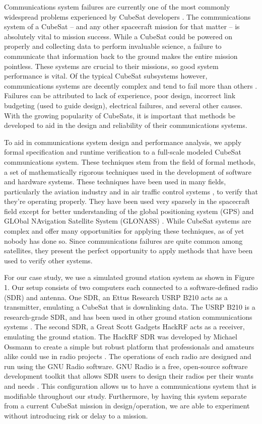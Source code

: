 \documentclass[conf]{new-aiaa}
\begin{document}
Communications system failures are currently one of the most commonly widespread problems experienced by CubeSat developers \cite{Improving2017,Langer2016}. The communications system of a CubeSat -- and any other spacecraft mission for that matter -- is absolutely vital to mission success. While a CubeSat could be powered on properly and collecting data to perform invaluable science, a failure to communicate that information back to the ground makes the entire mission pointless. These systems are crucial to their missions, so good system performance is vital. Of the typical CubeSat subsystems however, communications systems are decently complex and tend to fail more than others \cite{Improving2017,cubesat101}. Failures can be attributed to lack of experience, poor design, incorrect link budgeting (used to guide design), electrical failures, and several other causes. With the growing popularity of CubeSats, it is important that methods be developed to aid in the design and reliability of their communications systems.

To aid in communications system design and performance analysis, we apply formal specification and runtime verification to a full-scale modeled CubeSat communications system. These techniques stem from the field of formal methods, a set of mathematically rigorous techniques used in the development of software and hardware systems. These techniques have been used in many fields, particularly the aviation industry and in air traffic control systems \cite{GCMTR16,DRR17}, to verify that they're operating properly. They have been used very sparsely in the spacecraft field except for better understanding of the global positioning system (GPS) and GLObal NAvigation Satellite System (GLONASS) \cite{peng2013}. While CubeSat systems are complex and offer many opportunities for applying these techniques, as of yet nobody has done so. Since communications failures are quite common among satellites, they present the perfect opportunity to apply methods that have been used to verify other systems.

For our case study, we use a simulated ground station system as shown in Figure 1. Our setup consists of two computers each connected to a software-defined radio (SDR) and antenna. One SDR, an Ettus Research USRP B210 acts as a transmitter, emulating a CubeSat that is downlinking data. The USRP B210 is a research-grade SDR, and has been used in other ground station communications systems \cite{choi2017}. The second SDR, a Great Scott Gadgets HackRF acts as a receiver, emulating the ground station. The HackRF SDR was developed by Michael Ossmann to create a simple but robust platform that professionals and amateurs alike could use in radio projects \cite{GSG}. The operations of each radio are designed and run using the GNU Radio software. GNU Radio is a free, open-source software development toolkit that allows SDR users to design their radios per their wants and needs \cite{gnuradio}. This configuration allows us to have a communications system that is modifiable throughout our study. Furthermore, by having this system separate from a current CubeSat mission in design/operation, we are able to experiment without introducing risk or delay to a mission.
\end{document}
